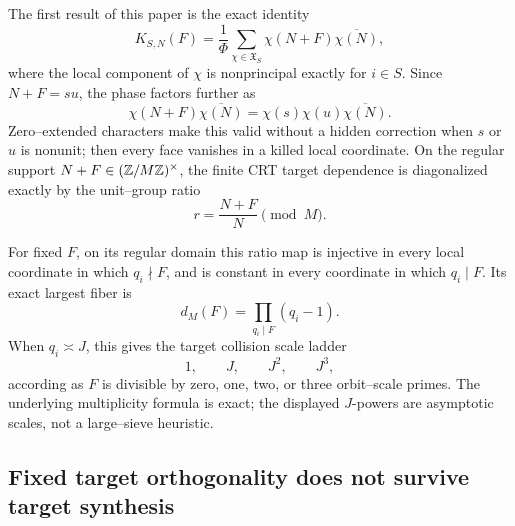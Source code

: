 The first result of this paper is the exact identity
\begin{equation}
 K_{S,N}(F)
 =\frac1\Phi\sum_{\chi\in\mathfrak X_S}
 \chi(N+F)\overline{\chi(N)},
 \label{eq:tpc38-intro-character-face}
\end{equation}
where the local component of \(\chi\) is nonprincipal exactly for
\(i\in S\).  Since \(N+F=su\), the phase factors further as
\begin{equation}
 \chi(N+F)\overline{\chi(N)}
 =\chi(s)\chi(u)\overline{\chi(N)}.
 \label{eq:tpc38-intro-product-factorization}
\end{equation}
Zero--extended characters make this valid without a hidden correction
when \(s\) or \(u\) is nonunit; then every face vanishes in a killed local
coordinate.  On the regular support
\(N+F\in(\mathbb Z/M\mathbb Z)^\times\), the finite CRT target dependence is
diagonalized exactly by the unit--group ratio
\begin{equation}
 r=\frac{N+F}{N}\pmod M.
 \label{eq:tpc38-intro-ratio}
\end{equation}

For fixed \(F\), on its regular domain this ratio map is injective in every local coordinate in
which \(q_i\nmid F\), and is constant in every coordinate in which
\(q_i\mid F\).  Its exact largest fiber is
\begin{equation}
 d_M(F)=\prod_{q_i\mid F}(q_i-1).
 \label{eq:tpc38-intro-collision-multiplicity}
\end{equation}
When \(q_i\asymp J\), this gives the target collision scale ladder
\begin{equation}
 1,\qquad J,\qquad J^2,\qquad J^3,
 \label{eq:tpc38-intro-collision-ladder}
\end{equation}
according as \(F\) is divisible by zero, one, two, or three orbit--scale
primes.  The underlying multiplicity formula is exact; the displayed
\(J\)-powers are asymptotic scales, not a large--sieve heuristic.

\subsection{Fixed target orthogonality does not survive target synthesis}


